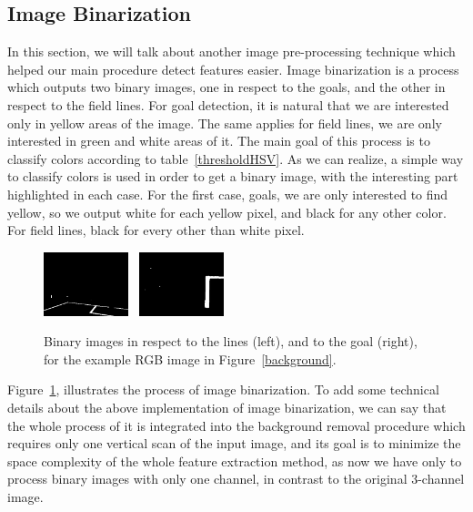 \documentclass[	DIV=calc,%
							paper=a4,%
							fontsize=9pt,%
							twocolumn]{scrartcl}	 					%
\begin{document}
\subsection{Image Binarization}
In this section, we will talk about another image pre-processing technique which helped our main procedure detect features easier. Image binarization is a process which outputs two binary images, one in respect to the goals, and the other in respect to the field lines. For goal detection, it is natural that we are interested only in yellow areas of the image. The same applies for field lines, we are only interested in green and white areas of it. The main goal of this process is to classify colors according to table~\ref{thresholdHSV}. As we can realize, a simple way to classify colors is used in order to get a binary image, with the interesting part highlighted in each case. For the first case, goals, we are only interested to find yellow, so we output white for each yellow pixel, and black for any other color. For field lines, black for every other than white pixel.

\begin{figure}[h!]
\caption{Binary images in respect to the lines (left),  and to the goal (right), for the example RGB image in Figure~\ref{background}.}
\label{binary}
\centering    
\includegraphics[width=0.22\textwidth]{figures/bin_lines.png} \	
\includegraphics[width=0.22\textwidth]{figures/bin_posts.png} \	
\end{figure}

Figure~\ref{binary}, illustrates the process of image binarization. To add some technical details about the above implementation of image binarization, we can say that the whole process of it is integrated into the background removal procedure which requires only one vertical scan of the input image, and its goal is to minimize the space complexity of the whole feature extraction method, as now we have only to process binary images with only one channel, in contrast to the original 3-channel image.
\end{document}
